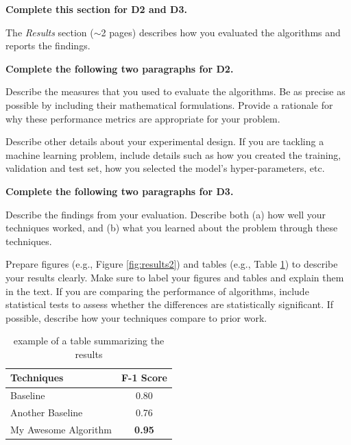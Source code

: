 \documentclass[letterpaper]{article} %
\begin{document}
{\bf Complete this section for D2 and D3.}

The {\it Results} section ($\sim$2 pages) describes how you evaluated the algorithms and reports the findings.  

{\bf Complete the following two paragraphs for D2.}

Describe the measures that you used to evaluate the algorithms.  Be as precise as possible by including their mathematical formulations.  Provide a rationale for why these performance metrics are appropriate for your problem.

Describe other details about your experimental design.  If you are tackling a machine learning problem, include details such as how you created the training, validation and test set, how you selected the model's hyper-parameters, etc.    

{\bf Complete the following two paragraphs for D3.}

Describe the findings from your evaluation.  Describe both (a) how well your techniques worked, and (b) what you learned about the problem through these techniques.  

Prepare figures (e.g., Figure \ref{fig:results2}) and tables (e.g., Table \ref{tab:results1}) to describe your results clearly.  Make sure to label your figures and tables and explain them in the text.  If you are comparing the performance of algorithms, include statistical tests to assess whether the differences are statistically significant.  If possible, describe how your techniques compare to prior work.  

\begin{table}[h!]
    \centering
    \normalsize{
    \begin{tabular}{ l c }
    \hline
         Techniques & F-1 Score\\
         \hline
          Baseline & 0.80 \\
          Another Baseline & 0.76\\
          My Awesome Algorithm & {\bf 0.95}\\
         \hline
    \end{tabular}}
    \caption{example of a table summarizing the results}
    \label{tab:results1}
\end{table} 
\end{document}
